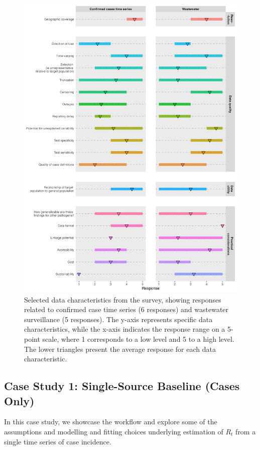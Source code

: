 \documentclass{article}
\begin{document}
%
\begin{figure}[H] 
\includegraphics[width=.97\linewidth]{figures/survey_responses.png}
\centering
\caption{ Selected data characteristics from the survey, showing responses related to confirmed case time series (6 responses) and wastewater surveillance (5 responses). The y-axis represents specific data characteristics, while the x-axis indicates the response range on a 5-point scale, where 1 corresponds to a low level and 5 to a high level. The lower triangles present the average response for each data characteristic.}
\label{survey_responses}
\end{figure}



\subsection{Case Study 1: Single-Source Baseline (Cases Only)}


In this case study, we showcase the workflow and explore some of the assumptions and modelling and fitting choices underlying estimation of $R_t$ from a single time series of case incidence.
\end{document}
